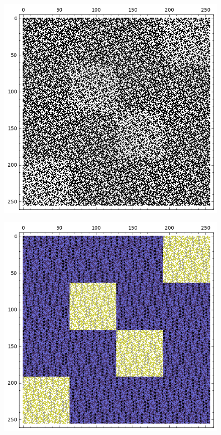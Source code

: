 \documentclass[12pt,a4paper]{article}
\begin{document}
\begin{figure}[!hb]
\centering
\begin{minipage}{.48\textwidth}
  \centering
  \includegraphics[width=.9\linewidth]{../matrix_plot/re8_7_weight_class_matrix.png}
  \label{fig:8_7_weight_class_matrix}
\end{minipage}%
\begin{minipage}{.48\textwidth}
  \centering
  \includegraphics[width=.9\linewidth]{../matrix_plot/re8_7_bent_cayley_graph_index_matrix.png}
  \label{fig:8_7_bent_cayley_graph_index_matrix}
\end{minipage}
\end{figure}
~
\end{document}

